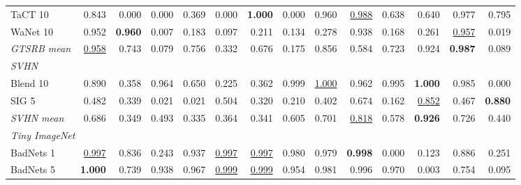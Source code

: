 \begin{table}[htbp]
\begin{adjustbox}{max width=\textwidth}
\begin{tabular}{lrrrrrrrrrrrrr}
TaCT 10 & 0.843 & \textcolor{black!45}{0.000} & \textcolor{black!45}{0.000} & \textcolor{black!45}{0.369} & \textcolor{black!45}{0.000} & \textbf{1.000} & \textcolor{black!45}{0.000} & 0.960 & \underline{0.988} & 0.638 & 0.640 & 0.977 & 0.795 \\
WaNet 10 & 0.952 & \textbf{0.960} & \textcolor{black!45}{0.007} & \textcolor{black!45}{0.183} & \textcolor{black!45}{0.097} & \textcolor{black!45}{0.211} & \textcolor{black!45}{0.134} & \textcolor{black!45}{0.278} & 0.938 & \textcolor{black!45}{0.168} & \textcolor{black!45}{0.261} & \underline{0.957} & \textcolor{black!45}{0.019} \\
\rowcolor{black!8}\emph{GTSRB mean} & \underline{0.958} & 0.743 & \textcolor{black!45}{0.079} & 0.756 & \textcolor{black!45}{0.332} & 0.676 & \textcolor{black!45}{0.175} & 0.856 & 0.584 & 0.723 & 0.924 & \textbf{0.987} & \textcolor{black!45}{0.089} \\
\multicolumn{14}{l}{\emph{SVHN}} \\
Blend 10 & 0.890 & \textcolor{black!45}{0.358} & 0.964 & 0.650 & \textcolor{black!45}{0.225} & \textcolor{black!45}{0.362} & 0.999 & \underline{1.000} & 0.962 & 0.995 & \textbf{1.000} & 0.985 & \textcolor{black!45}{0.000} \\
SIG 5 & \textcolor{black!45}{0.482} & \textcolor{black!45}{0.339} & \textcolor{black!45}{0.021} & \textcolor{black!45}{0.021} & 0.504 & \textcolor{black!45}{0.320} & \textcolor{black!45}{0.210} & \textcolor{black!45}{0.402} & 0.674 & \textcolor{black!45}{0.162} & \underline{0.852} & \textcolor{black!45}{0.467} & \textbf{0.880} \\
\rowcolor{black!8}\emph{SVHN mean} & 0.686 & \textcolor{black!45}{0.349} & \textcolor{black!45}{0.493} & \textcolor{black!45}{0.335} & \textcolor{black!45}{0.364} & \textcolor{black!45}{0.341} & 0.605 & 0.701 & \underline{0.818} & 0.578 & \textbf{0.926} & 0.726 & \textcolor{black!45}{0.440} \\
\multicolumn{14}{l}{\emph{Tiny ImageNet}} \\
BadNets 1 & \underline{0.997} & 0.836 & \textcolor{black!45}{0.243} & 0.937 & \underline{0.997} & \underline{0.997} & 0.980 & 0.979 & \textbf{0.998} & \textcolor{black!45}{0.000} & \textcolor{black!45}{0.123} & 0.886 & \textcolor{black!45}{0.251} \\
BadNets 5 & \textbf{1.000} & 0.739 & 0.938 & 0.967 & \underline{0.999} & \underline{0.999} & 0.954 & 0.981 & 0.996 & 0.970 & \textcolor{black!45}{0.003} & 0.754 & \textcolor{black!45}{0.095} \\

\end{tabular}
\end{adjustbox}
\end{table}

